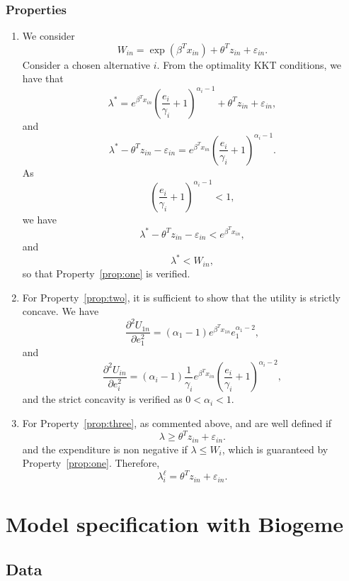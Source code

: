 \documentclass[12pt,a4paper]{article}
\begin{document}
\subsubsection*{Properties}
\begin{enumerate}
    \item
We consider
\[
    W_{in}  =\exp(\beta^T x_{in}) + \theta^T z_{in} + \varepsilon_{in}.
\]
Consider a chosen alternative $i$. From the optimality KKT conditions, we have that
\begin{equation}
    \label{eq:non_mon_opt}
   \lambda^* =  e^{\beta^T x_{in}}  \left(\frac{e_i}{\gamma_i}+1\right)^{\alpha_i-1} + \theta^T z_{in} + \varepsilon_{in},
\end{equation}
and
\[
   \lambda^* - \theta^T z_{in} - \varepsilon_{in}=  e^{\beta^T x_{in}}  \left(\frac{e_i}{\gamma_i}+1\right)^{\alpha_i-1}.
\]
As
\[
     \left(\frac{e_i}{\gamma_i}+1\right)^{\alpha_i-1} < 1,
\]
we have
\[
     \lambda^* - \theta^T z_{in} - \varepsilon_{in} <  e^{\beta^T x_{in}},
\]
and
\[
    \lambda^* < W_{in},
\]
so that Property~\ref{prop:one} is verified.

\item For Property~\ref{prop:two}, it is sufficient to show that the utility is strictly concave.
We have
\[
    \frac{\partial^2 U_{1n}}{\partial e_1^2} = (\alpha_1-1)e^{\beta^T x_{1n}}  e_1^{\alpha_1-2},
\]
and
\[
    \frac{\partial^2 U_{in}}{\partial e_i^2} = (\alpha_i-1)\frac{1}{\gamma_i}e^{\beta^T x_{in}}  \left(\frac{e_i}{\gamma_i}+1\right)^{\alpha_i-2},
\]
and the strict concavity is verified as $0 < \alpha_i < 1$.

\item For Property~\ref{prop:three},  as commented above,  and  are
    well defined if
    \[
        \lambda \geq \theta^T z_{in} + \varepsilon_{in}.
    \]
    and the expenditure is non negative if $\lambda \leq W_i$, which is guaranteed by Property~\ref{prop:one}. Therefore,
    \[
        \lambda^{\ell}_i = \theta^T z_{in} + \varepsilon_{in}.
    \]
\end{enumerate}

\section{Model specification with Biogeme}

\subsection{Data}
\end{document}
